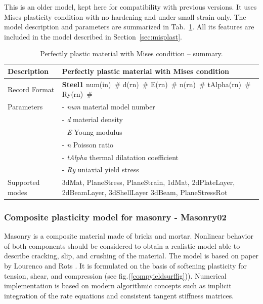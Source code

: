 \documentclass[a4paper]{article}
\newcommand{\descitem}[1]{{\noindent \bf #1}}
\newcommand{\elemparam}[2]{{{#1\tiny (#2)}~\#}}
\newcommand{\param}[1]{{\it #1}}
\begin{document}
This is an older model, kept here for compatibility with previous versions.
It uses Mises plasticity condition with no hardening and under small strain only.
The model description and parameters are summarized
in Tab.~\ref{Steel1_table}. All its features are included in the model
described in Section~\ref{sec:misplast}. 

\begin{table}[!htb]
\begin{tabular}{|l|p{9cm}|}
\hline
Description & Perfectly plastic material with Mises condition\\
\hline
Record Format & \descitem{Steel1} \elemparam{num}{in}
\elemparam{d}{rn} \elemparam{E}{rn} \elemparam{n}{rn}
\elemparam{tAlpha}{rn} \elemparam{Ry}{rn}\\
Parameters &- \param{num} material model number\\
&- \param{d} material density\\
&- \param{E} Young modulus\\
&- \param{n} Poisson ratio\\
&- \param{tAlpha} thermal dilatation coefficient\\
&- \param{Ry} uniaxial yield stress\\
Supported modes& 3dMat, PlaneStress, PlaneStrain, 1dMat,
2dPlateLayer, 2dBeamLayer, 3dShellLayer
3dBeam, PlaneStressRot\\
\hline
\end{tabular}
\caption{Perfectly plastic material  with Mises condition -- summary.}
\label{Steel1_table}
\end{table}


\subsubsection{Composite plasticity model for masonry - Masonry02}
Masonry is a composite material made of bricks and mortar. Nonlinear behavior of both components should be considered to obtain a realistic model able to describe cracking, slip, and crushing of the material. The model is based on paper by Lourenco and Rots \cite{Rots}. It is formulated on the basis of softening plasticity for tension, shear, and compression (see fig.(\ref{compyieldsurffig})). Numerical implementation is based on modern algorithmic concepts such as implicit integration of the rate equations and consistent tangent stiffness matrices.
\end{document}
